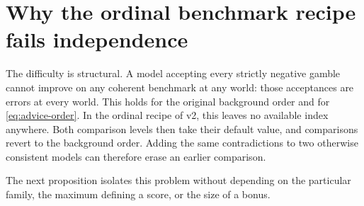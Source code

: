 \documentclass[11pt]{article}
\theoremstyle{remark}
\begin{document}
\section{Why the ordinal benchmark recipe fails independence}

The difficulty is structural. A model accepting every strictly negative
gamble cannot improve on any coherent benchmark at any world: those
acceptances are errors at every world. This holds for the original background
order and for \eqref{eq:advice-order}. In the ordinal recipe of v2, this leaves
no available index anywhere. Both comparison levels then take their default
value, and comparisons revert to the background order. Adding the same
contradictions to two otherwise consistent models can therefore erase an
earlier comparison.

The next proposition isolates this problem without depending on the
particular family, the maximum defining a score, or the size of a bonus.
\end{document}
